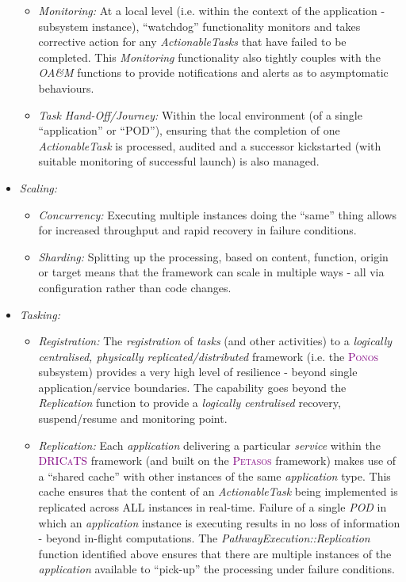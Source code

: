 \documentclass[a4paper]{book}
\newcommand{\dricats}{\textsc{\textcolor{Purple}{\small{DRICaTS }}}}
\newcommand{\petasos}{\textsc{\textcolor{Purple}{\small{Petasos }}}}
\newcommand{\ponos}{\textsc{\textcolor{Purple}{\small{Ponos }}}}
\begin{document}
\begin{itemize}
\begin{itemize}
            \item \textit{Monitoring:} At a local level (i.e. within the context of the application  - subsystem instance), ``watchdog'' functionality monitors and takes corrective action for any \textit{ActionableTasks} that have failed to be completed. This \textit{Monitoring} functionality also tightly couples with the \textit{OA\&M} functions to provide notifications and alerts as to asymptomatic behaviours.
            \item \textit{Task Hand-Off/Journey:} Within the local environment (of a single ``application'' or ``POD''), ensuring that the completion of one \textit{ActionableTask} is processed, audited and a successor kickstarted (with suitable monitoring of successful launch) is also managed.
        \end{itemize}
        \item \textit{Scaling:}
        \begin{itemize}
            \item \textit{Concurrency:} Executing multiple instances doing the ``same'' thing allows for increased throughput and rapid recovery in failure conditions.
            \item \textit{Sharding:} Splitting up the processing, based on content, function, origin or target means that the framework can scale in multiple ways - all via configuration rather than code changes.
        \end{itemize}
        \item \textit{Tasking:}
        \begin{itemize}
            \item \textit{Registration:} The \textit{registration} of \textit{tasks} (and other activities) to a \textit{logically centralised, physically replicated/distributed} framework (i.e. the \ponos subsystem) provides a very high level of resilience - beyond single application/service boundaries. The capability goes beyond the \textit{Replication} function to provide a \textit{logically centralised} recovery, suspend/resume and monitoring point.
            \item \textit{Replication:} Each \textit{application} delivering a particular \textit{service} within the \dricats framework (and built on the \petasos framework) makes use of a ``shared cache'' with other instances of the same \textit{application} type. This cache ensures that the content of an \textit{ActionableTask} being implemented is replicated across ALL instances in real-time. Failure of a single \textit{POD} in which an \textit{application} instance is executing results in no loss of information - beyond in-flight computations. The \textit{PathwayExecution::Replication} function identified above ensures that there are multiple instances of the \textit{application} available to ``pick-up'' the processing under failure conditions.

\end{itemize}
\end{itemize}
\end{document}
